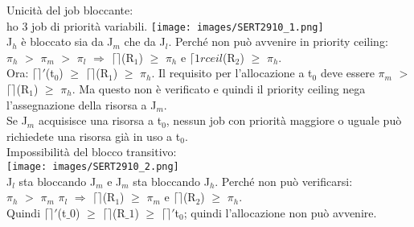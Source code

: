 \documentclass[18px]{article}
\begin{document}
Unicità del job bloccante:\\ ho 3 job di priorità variabili.
\texttt{[image: images/SERT2910\_1.png]}\\
J$_{h}$ è bloccato sia da J$_{m}$ che da J$_{l}$. Perché non può avvenire in priority ceiling:\\ $\pi_{h}$ $>$ $\pi_{m}$ $>$ $\pi_{l}$ $\Rightarrow$ $\lceil\rceil$(R$_{1}$) $\geq$ $\pi_{h}$ e $\lceil1rceil$(R$_{2}$) $\geq$ $\pi_{h}$.\\ Ora: $\lceil\rceil'$(t$_{0}$) $\geq$ $\lceil\rceil$(R$_{1}$) $\geq$ $\pi_{h}$. Il requisito per l'allocazione a t$_{0}$ deve essere $\pi_{m}$ $>$ $\lceil\rceil$(R$_{1}$) $\geq$ $\pi_{h}$. Ma questo non è verificato e quindi il priority ceiling nega l'assegnazione della risorsa a J$_{m}$.\\ Se J$_{m}$ acquisisce una risorsa a t$_{0}$, nessun job con priorità maggiore o uguale può richiedete una risorsa già in uso a t$_{0}$.\\ Impossibilità del blocco transitivo:\\
\texttt{[image: images/SERT2910\_2.png]}\\
J$_{l}$ sta bloccando J$_{m}$ e J$_{m}$ sta bloccando J$_{h}$. Perché non può verificarsi:\\ $\pi_{h}$ $>$ $\pi_{m}$ $\pi_{l}$ $\Rightarrow$ $\lceil\rceil$(R$_{1}$) $\geq$ $\pi_{m}$ e $\lceil\rceil$(R$_{2}$) $\geq$ $\pi_{h}$.\\ Quindi $\lceil\rceil'$(t$\_{0}$) $\geq$ $\lceil\rceil$(R$\_{1}$) $\geq$ $\lceil\rceil'$t$_{0}$; quindi l'allocazione non può avvenire.\\
\end{document}
